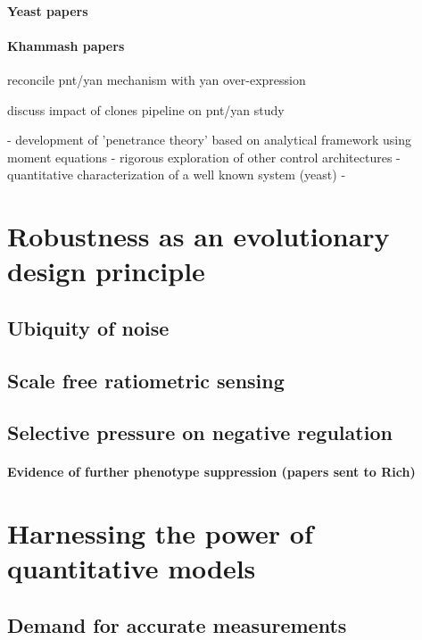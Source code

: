 		\paragraph{Yeast papers}
		\paragraph{Khammash papers}



reconcile pnt/yan mechanism with yan over-expression

discuss impact of clones pipeline on pnt/yan study


- development of 'penetrance theory' based on analytical framework using moment equations
- rigorous exploration of other control architectures
- quantitative characterization of a well known system (yeast)
- 


\section{Robustness as an evolutionary design principle}

	\subsection{Ubiquity of noise}	
	
	\subsection{Scale free ratiometric sensing}
	
	\subsection{Selective pressure on negative regulation}
	
		\paragraph{Evidence of further phenotype suppression (papers sent to Rich)}

\section{Harnessing the power of quantitative models}

	\subsection{Demand for accurate measurements}
	
